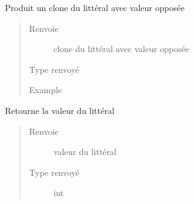 \documentclass[letterpaper,10pt,french]{sphinxmanual}
\begin{document}
\begin{fulllineitems}
\begin{fulllineitems}
\begin{quote}
\begin{description}
\end{description}\end{quote}

\end{fulllineitems}


\begin{fulllineitems}
\label{\detokenize{litteral:litteral.Litteral.negClone}}
Produit un clone du littéral avec valeur opposée
\begin{quote}\begin{description}
\item[{Renvoie}] \leavevmode
clone du littéral avec valeur opposée

\item[{Type renvoyé}] \leavevmode
{\hyperref[\detokenize{litteral:litteral.Litteral}]{}}

\item[{Example}] \leavevmode
\begin{sphinxVerbatim}[commandchars=\\\{\}]
\end{sphinxVerbatim}

\end{description}\end{quote}

\end{fulllineitems}


\begin{fulllineitems}
\label{\detokenize{litteral:litteral.Litteral.value}}
Retourne la valeur du littéral
\begin{quote}\begin{description}
\item[{Renvoie}] \leavevmode
valeur du littéral

\item[{Type renvoyé}] \leavevmode
int


\end{description}
\end{quote}
\end{fulllineitems}
\end{fulllineitems}
\end{document}
